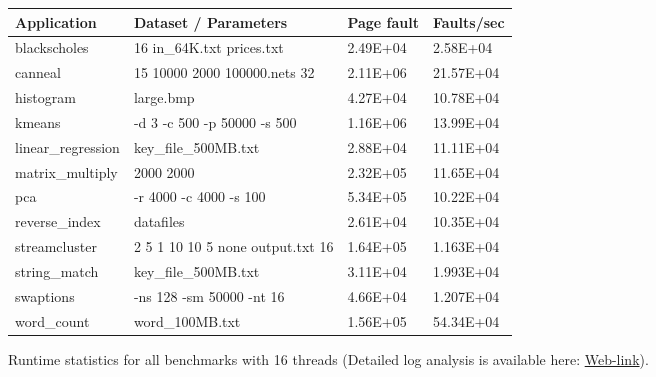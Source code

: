 \begin{figure}[t]
\centering
\myfontsize
{
\begin{tabular}{m{1.6cm}|m{3.2cm}| m{1.1cm}|m{1.3cm}}
   { Application} & Dataset / Parameters & Page fault & Faults/sec\\
  \hline \hline
    blackscholes& 16 in\_64K.txt prices.txt & 2.49E+04& 2.58E+04 \\
    canneal& 15 10000 2000 100000.nets 32 & 2.11E+06 & 21.57E+04 \\
    histogram& large.bmp & 4.27E+04 & 10.78E+04	  \\
    kmeans& -d 3 -c 500 -p 50000 -s 500 & 1.16E+06 & 13.99E+04  \\
    linear\_regression& key\_file\_500MB.txt & 2.88E+04 & 11.11E+04  \\
    matrix\_multiply& 2000 2000 & 2.32E+05 & 11.65E+04  \\
    pca& -r 4000 -c 4000 -s 100 & 5.34E+05 & 10.22E+04\\
    reverse\_index & datafiles & 2.61E+04 & 10.35E+04  \\
    streamcluster& 2 5 1 10 10 5 none output.txt 16 & 1.64E+05 & 1.163E+04\\
    string\_match &key\_file\_500MB.txt & 3.11E+04 & 1.993E+04\\
    swaptions & -ns 128 -sm 50000 -nt 16  & 4.66E+04 & 1.207E+04 \\
    word\_count& word\_100MB.txt	 & 1.56E+05 & 54.34E+04  \\

\hline
\end{tabular}
}


\caption{\label{tab:apps} Runtime statistics for all benchmarks with 16 threads (Detailed log analysis is available here: \href{https://mic92.github.io/inspector/index.html\#measurement_table}{Web-link}). }                                                                                                                                  


\end{figure}
